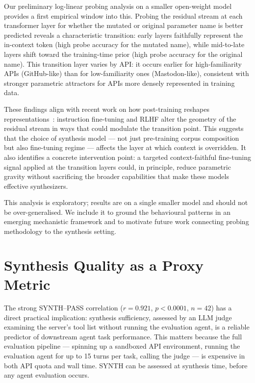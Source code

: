 \documentclass[12pt]{report}
\begin{document}
Our preliminary log-linear probing analysis on a smaller open-weight model
provides a first empirical window into this. Probing the residual stream at
each transformer layer for whether the mutated or original parameter name is
better predicted reveals a characteristic transition: early layers
faithfully represent the in-context token (high probe accuracy for the
mutated name), while mid-to-late layers shift toward the training-time
prior (high probe accuracy for the original name). This transition layer
varies by API: it occurs earlier for high-familiarity APIs (GitHub-like)
than for low-familiarity ones (Mastodon-like), consistent with stronger
parametric attractors for APIs more densely represented in training data.

These findings align with recent work on how post-training reshapes
representations~\cite{posttrainingreshapes2025}: instruction fine-tuning
and RLHF alter the geometry of the residual stream in ways that could
modulate the transition point. This suggests that the choice of synthesis
model --- not just pre-training corpus composition but also fine-tuning
regime --- affects the layer at which context is overridden. It also
identifies a concrete intervention point: a targeted context-faithful
fine-tuning signal applied at the transition layers could, in principle,
reduce parametric gravity without sacrificing the broader capabilities that
make these models effective synthesizers.

This analysis is exploratory; results are on a single smaller model and
should not be over-generalised. We include it to ground the behavioural
patterns in an emerging mechanistic framework and to motivate future work
connecting probing methodology to the synthesis setting.

\section{Synthesis Quality as a Proxy Metric}

The strong SYNTH--PASS correlation ($r = 0.921$, $p < 0.0001$, $n = 42$)
has a direct practical implication: synthesis sufficiency, assessed by an
LLM judge examining the server's tool list without running the evaluation
agent, is a reliable predictor of downstream agent task performance. This
matters because the full evaluation pipeline --- spinning up a sandboxed API
environment, running the evaluation agent for up to 15 turns per task,
calling the judge --- is expensive in both API quota and wall time. SYNTH
can be assessed at synthesis time, before any agent evaluation occurs.
\end{document}
